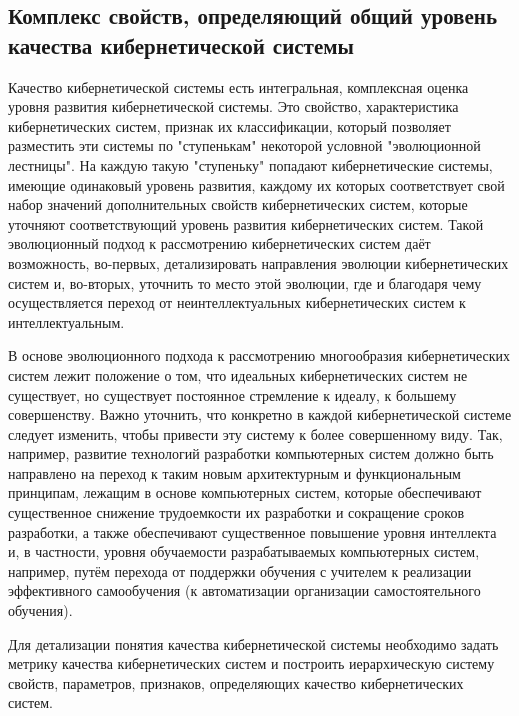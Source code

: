 \subsection{Комплекс свойств, определяющий общий уровень качества кибернетической системы}
{\label{sec_cyb_syst_overall_quality}} 

Качество кибернетической системы есть интегральная, комплексная оценка уровня развития кибернетической системы. 
Это свойство, характеристика кибернетических систем, признак их классификации, который позволяет разместить эти системы по "ступенькам"{} некоторой условной "эволюционной лестницы"{}.
На каждую такую "ступеньку"{} попадают кибернетические системы, имеющие одинаковый уровень развития, каждому их которых соответствует свой набор значений дополнительных свойств кибернетических систем, которые уточняют соответствующий уровень развития кибернетических систем. 
Такой эволюционный подход к рассмотрению кибернетических систем даёт возможность, во-первых, детализировать направления эволюции кибернетических систем и, во-вторых, уточнить то место этой эволюции, где и благодаря чему осуществляется переход от неинтеллектуальных кибернетических систем к интеллектуальным.

В основе эволюционного подхода к рассмотрению многообразия кибернетических систем лежит положение о том, что идеальных кибернетических систем не существует, но существует постоянное стремление к идеалу, к большему совершенству. 
Важно уточнить, что конкретно в каждой кибернетической системе следует изменить, чтобы привести эту систему к более совершенному виду.
Так, например, развитие технологий разработки компьютерных систем должно быть направлено на переход к таким новым архитектурным и функциональным принципам, лежащим в основе компьютерных систем, которые обеспечивают существенное снижение трудоемкости их разработки и сокращение сроков разработки, а также обеспечивают существенное повышение уровня интеллекта и, в частности, уровня обучаемости разрабатываемых компьютерных систем, например, путём перехода от поддержки обучения с учителем к реализации эффективного самообучения (к автоматизации организации самостоятельного обучения). 

Для детализации понятия качества кибернетической системы необходимо задать метрику качества кибернетических систем и построить иерархическую систему свойств, параметров, признаков, определяющих качество кибернетических систем.

